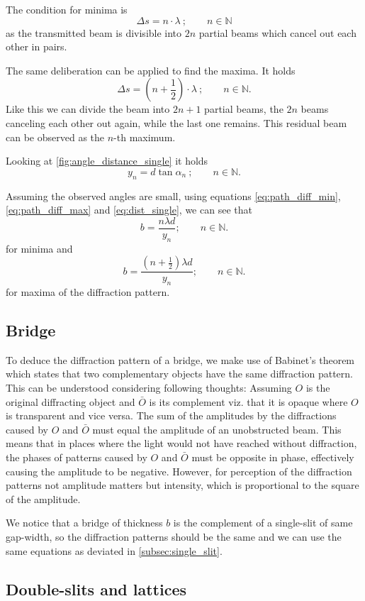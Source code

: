 The condition for minima is
\begin{equation}\label{eq:path_diff_min}
	\Delta s = n\cdot\lambda\ ;\qquad n\in\mathbb{N}
\end{equation}
as the transmitted beam is divisible into $2n$ partial beams which cancel out each other in pairs.

The same deliberation can be applied to find the maxima.
It holds
\begin{equation}\label{eq:path_diff_max}
	\Delta s = \left(n+\frac{1}{2}\right)\cdot\lambda\ ;\qquad n\in\mathbb{N}.
\end{equation}
Like this we can divide the beam into $2n+1$ partial beams, the $2n$ beams canceling each other out again, while the last one remains.
This residual beam can be observed as the $n$-th maximum.

Looking at \autoref{fig:angle_distance_single} it holds
\begin{equation}\label{eq:dist_single}
	y_n = d\tan\alpha_n\ ;\qquad n\in\mathbb{N}.
\end{equation}

Assuming the observed angles are small, using equations \ref{eq:path_diff_min}, \ref{eq:path_diff_max} and \ref{eq:dist_single}, we can see that
\begin{equation}\label{eq:single_slit_minima}
	b = \frac{n\lambda d}{y_n} ;\qquad n\in\mathbb{N}.
\end{equation}
for minima and
\begin{equation}\label{eq:single_slit_maxima}
	b = \frac{\left(n+\frac{1}{2}\right)\lambda d}{y_n} ;\qquad n\in\mathbb{N}.
\end{equation}
for maxima of the diffraction pattern.

\subsection{Bridge}
To deduce the diffraction pattern of a bridge, we make use of Babinet's theorem which states that two complementary objects have the same diffraction pattern.
This can be understood considering following thoughts:
Assuming $O$ is the original diffracting object and $\bar{O}$ is its complement viz. that it is opaque where $O$ is transparent and vice versa.
The sum of the amplitudes by the diffractions caused by $O$ and $\bar{O}$ must equal the amplitude of an unobstructed beam.
This means that in places where the light would not have reached without diffraction, the phases of patterns caused by $O$ and $\bar{O}$ must be opposite in phase, effectively causing the amplitude to be negative.
However, for perception of the diffraction patterns not amplitude matters but intensity, which is proportional to the square of the amplitude.

We notice that a bridge of thickness $b$ is the complement of a single-slit of same gap-width, so the diffraction patterns should be the same and we can use the same equations as deviated in \autoref{subsec:single_slit}.

\subsection{Double-slits and lattices}
